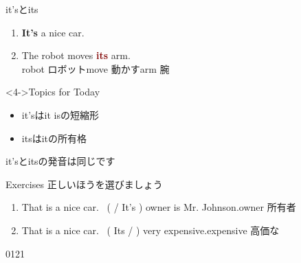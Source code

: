 \documentclass[aspectratio=169,xcolor={dvipsnames,table}]{beamer}
\begin{document}
\begin{frame}[plain]{it'sとits\hspace{30pt}}
\Large
 \begin{enumerate}
  \item<2-> \textcolor{NavyBlue}{\bfseries It's} a nice car.
  \item<3-> The robot moves \textcolor{Maroon}{\bfseries its} arm.\\
\hfill{\scriptsize robot  ロボット\hspace{1\zw}move  動かす\hspace{1\zw}arm  腕}
 \end{enumerate}
\normalsize

\vfill

\begin{block}<4->{Topics for Today}
 \begin{itemize}[square]
  \item {it's}は{it is}の短縮形
  \item itsはitの所有格
 \end{itemize}

\hfill{}it'sとitsの発音は同じです \hspace*{1\zw}
     \end{block}

\end{frame}
\begin{frame}[plain]{Exercises}
 正しいほうを選びましょう

 \begin{enumerate}
  \item That is a nice car.\,\,\,\,\,(  / It's ) owner is Mr. Johnson.\hfill{\scriptsize owner  所有者}
  \item That is a nice car.\,\,\,\,\,(  Its /  ) very expensive.\hfill{\scriptsize expensive  高価な}
 \end{enumerate}

\vfill

\hfill{\tiny 0121}\,{\scriptsize {}}
\end{frame}
\end{document}
